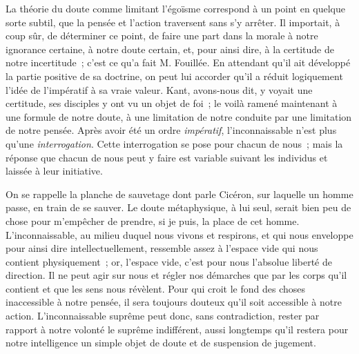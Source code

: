 \documentclass[french,twoside]{book} %
\begin{document}
La théorie du doute comme limitant l’égoïsme correspond à un point en quelque sorte subtil, que la pensée et l’action traversent sans s’y arrêter. Il importait, à coup sûr, de déterminer ce point, de faire une part dans la morale à notre ignorance certaine, à notre doute certain, et, pour ainsi dire, à la certitude de notre incertitude ; c’est ce qu’a fait M. Fouillée. En attendant qu’il ait développé la partie positive de sa doctrine, on peut lui accorder qu’il a réduit logiquement l’idée de l’impératif à sa vraie valeur. Kant, avons-nous dit, y voyait une certitude, ses disciples y ont vu un objet de foi ; le voilà ramené maintenant à une formule de notre doute, à une limitation de notre conduite par une limitation de notre pensée. Après avoir été un ordre \emph{impératif}, l’inconnaissable n’est plus qu’une \emph{interrogation}. Cette interrogation se pose pour chacun de nous ; mais la réponse que chacun de nous peut y faire est variable suivant les individus et laissée à leur initiative.\par
On se rappelle la planche de sauvetage dont parle Cicéron, sur laquelle un homme passe, en train de se sauver. Le doute métaphysique, à lui seul, serait bien peu de chose pour m’empêcher de prendre, si je puis, la place de cet homme. L’inconnaissable, au milieu duquel nous vivons et respirons, et qui nous enveloppe pour ainsi dire intellectuellement, ressemble assez à l’espace vide qui nous contient physiquement ; or, l’espace vide, c’est pour nous l’absolue liberté de direction. Il ne peut agir sur nous et régler nos démarches que par les corps qu’il contient et que les sens nous révèlent. Pour qui croit le fond des choses inaccessible à notre pensée, il sera toujours douteux qu’il soit accessible à notre action. L’inconnaissable suprême peut donc, sans contradiction, rester par rapport à notre volonté le suprême indifférent, aussi longtemps qu’il restera pour notre intelligence un simple objet de doute et de suspension de jugement.\par
\end{document}
